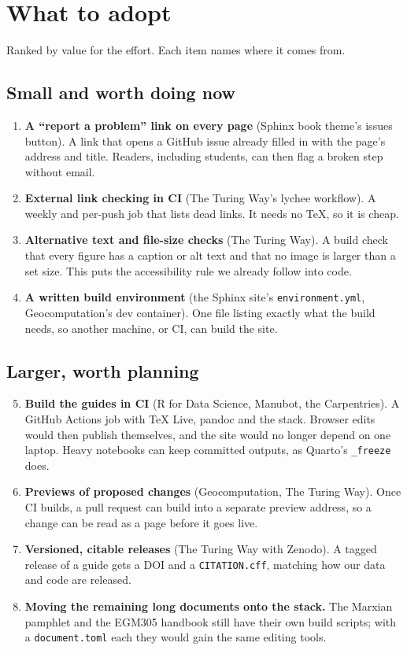 \chapter{What to adopt}

Ranked by value for the effort. Each item names where it comes from.

\section{Small and worth doing now}

\begin{enumerate}
\item \textbf{A ``report a problem'' link on every page} (Sphinx book theme's issues button). A link that opens a GitHub issue already filled in with the page's address and title. Readers, including students, can then flag a broken step without email.
\item \textbf{External link checking in CI} (The Turing Way's lychee workflow). A weekly and per-push job that lists dead links. It needs no TeX, so it is cheap.
\item \textbf{Alternative text and file-size checks} (The Turing Way). A build check that every figure has a caption or alt text and that no image is larger than a set size. This puts the accessibility rule we already follow into code.
\item \textbf{A written build environment} (the Sphinx site's \texttt{environment.yml}, Geocomputation's dev container). One file listing exactly what the build needs, so another machine, or CI, can build the site.
\end{enumerate}

\section{Larger, worth planning}

\begin{enumerate}
\setcounter{enumi}{4}
\item \textbf{Build the guides in CI} (R for Data Science, Manubot, the Carpentries). A GitHub Actions job with TeX Live, pandoc and the stack. Browser edits would then publish themselves, and the site would no longer depend on one laptop. Heavy notebooks can keep committed outputs, as Quarto's \texttt{\_freeze} does.
\item \textbf{Previews of proposed changes} (Geocomputation, The Turing Way). Once CI builds, a pull request can build into a separate preview address, so a change can be read as a page before it goes live.
\item \textbf{Versioned, citable releases} (The Turing Way with Zenodo). A tagged release of a guide gets a DOI and a \texttt{CITATION.cff}, matching how our data and code are released.
\item \textbf{Moving the remaining long documents onto the stack.} The Marxian pamphlet and the EGM305 handbook still have their own build scripts; with a \texttt{document.toml} each they would gain the same editing tools.
\end{enumerate}

